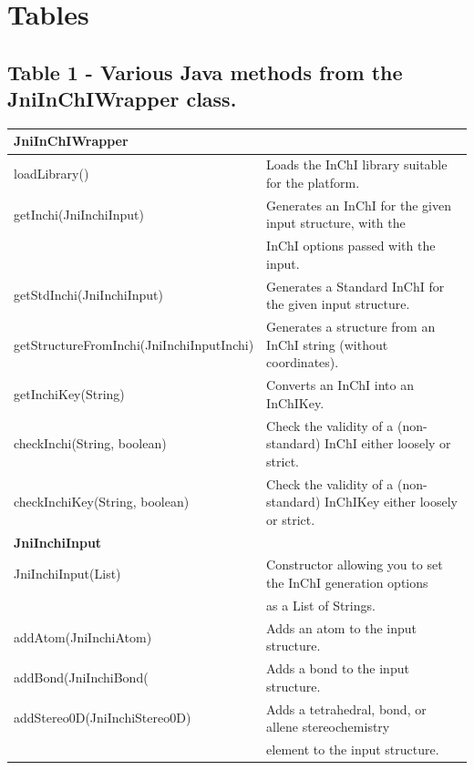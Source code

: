 \documentclass[10pt]{bmc_article}
\newenvironment{bmcformat}{\fussy\setboolean{publ}{true}}{\fussy}
\begin{document}
\begin{bmcformat}


\newpage

\section*{Tables}
  \subsection*{Table 1 - Various Java methods from the JniInChIWrapper class.}
  \label{tab:wrapper}
\begin{tabular}{ll}
\textbf{JniInChIWrapper} & \\
\hline
loadLibrary() & Loads the InChI library suitable for the platform. \\
getInchi(JniInchiInput) & Generates an InChI for the given input structure, with the \\
                        & InChI options passed with the input. \\
getStdInchi(JniInchiInput) & Generates a Standard InChI for the given input structure. \\
getStructureFromInchi(JniInchiInputInchi) & Generates a structure from an InChI string (without coordinates). \\
getInchiKey(String) & Converts an InChI into an InChIKey. \\
checkInchi(String, boolean) & Check the validity of a (non-standard) InChI either loosely or strict. \\
checkInchiKey(String, boolean) & Check the validity of a (non-standard) InChIKey either loosely or strict. \\
\hline
\textbf{JniInchiInput} & \\
\hline
JniInchiInput(List) & Constructor allowing you to set the InChI generation options \\
                     & as a List of Strings. \\
addAtom(JniInchiAtom) & Adds an atom to the input structure. \\
addBond(JniInchiBond( & Adds a bond to the input structure. \\
addStereo0D(JniInchiStereo0D) & Adds a tetrahedral, bond, or allene stereochemistry \\
                              & element to the input structure. \\
\end{tabular}


\end{bmcformat}
\end{document}
